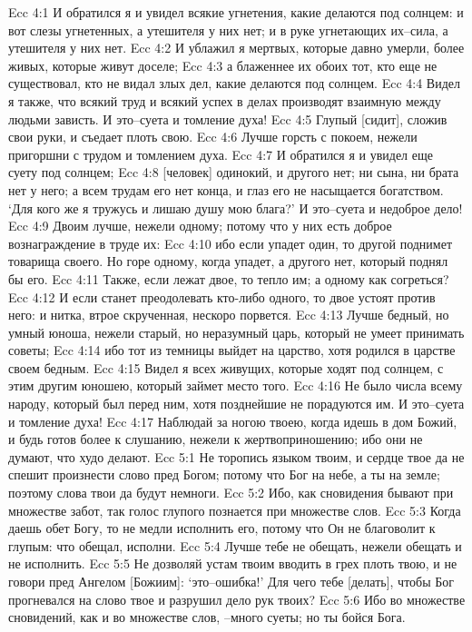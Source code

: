 Ecc 4:1  И обратился я и увидел всякие угнетения, какие делаются под солнцем: и вот слезы угнетенных, а утешителя у них нет; и в руке угнетающих их--сила, а утешителя у них нет.
Ecc 4:2  И ублажил я мертвых, которые давно умерли, более живых, которые живут доселе;
Ecc 4:3  а блаженнее их обоих тот, кто еще не существовал, кто не видал злых дел, какие делаются под солнцем.
Ecc 4:4  Видел я также, что всякий труд и всякий успех в делах производят взаимную между людьми зависть. И это--суета и томление духа!
Ecc 4:5  Глупый [сидит], сложив свои руки, и съедает плоть свою.
Ecc 4:6  Лучше горсть с покоем, нежели пригоршни с трудом и томлением духа.
Ecc 4:7  И обратился я и увидел еще суету под солнцем;
Ecc 4:8  [человек] одинокий, и другого нет; ни сына, ни брата нет у него; а всем трудам его нет конца, и глаз его не насыщается богатством. `Для кого же я тружусь и лишаю душу мою блага?' И это--суета и недоброе дело!
Ecc 4:9  Двоим лучше, нежели одному; потому что у них есть доброе вознаграждение в труде их:
Ecc 4:10  ибо если упадет один, то другой поднимет товарища своего. Но горе одному, когда упадет, а другого нет, который поднял бы его.
Ecc 4:11  Также, если лежат двое, то тепло им; а одному как согреться?
Ecc 4:12  И если станет преодолевать кто-либо одного, то двое устоят против него: и нитка, втрое скрученная, нескоро порвется.
Ecc 4:13  Лучше бедный, но умный юноша, нежели старый, но неразумный царь, который не умеет принимать советы;
Ecc 4:14  ибо тот из темницы выйдет на царство, хотя родился в царстве своем бедным.
Ecc 4:15  Видел я всех живущих, которые ходят под солнцем, с этим другим юношею, который займет место того.
Ecc 4:16  Не было числа всему народу, который был перед ним, хотя позднейшие не порадуются им. И это--суета и томление духа!
Ecc 4:17  Наблюдай за ногою твоею, когда идешь в дом Божий, и будь готов более к слушанию, нежели к жертвоприношению; ибо они не думают, что худо делают.
Ecc 5:1  Не торопись языком твоим, и сердце твое да не спешит произнести слово пред Богом; потому что Бог на небе, а ты на земле; поэтому слова твои да будут немноги.
Ecc 5:2  Ибо, как сновидения бывают при множестве забот, так голос глупого познается при множестве слов.
Ecc 5:3  Когда даешь обет Богу, то не медли исполнить его, потому что Он не благоволит к глупым: что обещал, исполни.
Ecc 5:4  Лучше тебе не обещать, нежели обещать и не исполнить.
Ecc 5:5  Не дозволяй устам твоим вводить в грех плоть твою, и не говори пред Ангелом [Божиим]: `это--ошибка!' Для чего тебе [делать], чтобы Бог прогневался на слово твое и разрушил дело рук твоих?
Ecc 5:6  Ибо во множестве сновидений, как и во множестве слов, --много суеты; но ты бойся Бога.
